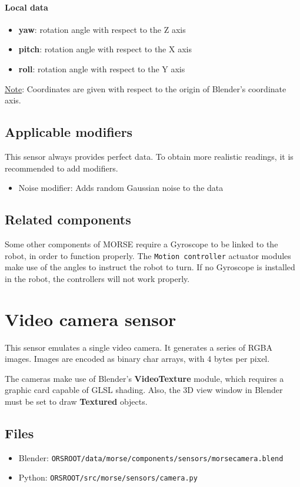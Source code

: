 \documentclass[twoside,a4paper,10pt]{report}
\newcommand{\dokutitlelevelone}[1]{\chapter{#1}}
\newcommand{\dokutitleleveltwo}[1]{\section{#1}}
\newcommand{\dokutitlelevelfour}[1]{\subsubsection{#1}}
\newcommand{\dokubold}[1]{\textbf{#1}}
\newcommand{\dokumonospace}[1]{\texttt{#1}}
\newcommand{\dokuunderline}[1]{\underline{#1}}
\newcommand{\dokuitem}{\item}
\begin{document}
\dokutitlelevelfour{Local data}

\begin{itemize}
\dokuitem  \dokubold{yaw}: rotation angle with respect to the Z axis
\dokuitem  \dokubold{pitch}: rotation angle with respect to the X axis
\dokuitem  \dokubold{roll}: rotation angle with respect to the Y axis
\end{itemize}

\dokuunderline{Note}: Coordinates are given with respect to the origin of Blender's coordinate axis.


\dokutitleleveltwo{Applicable modifiers}
\label{e70c0c8fd69fbf29dc4de09110825004}%

This sensor always provides perfect data.
To obtain more realistic readings, it is recommended to add modifiers.



\begin{itemize}
\dokuitem  Noise modifier: Adds random Gaussian noise to the data
\end{itemize}

\dokutitleleveltwo{Related components}
\label{72610f0a0494668833b2c5de69dd5e02}%

Some other components of MORSE require a Gyroscope to be linked to the robot, in order to function properly. The \dokumonospace{Motion controller} actuator modules make use of the angles to instruct the robot to turn. If no Gyroscope is installed in the robot, the controllers will not work properly.


\dokutitlelevelone{Video camera sensor}
\label{2157f6689a9fa010e655f615edf5281d}%
\label{dd6d2dcc679d12b9430a9787bab45b33}%

This sensor emulates a single video camera. It generates a series of RGBA images. Images are encoded as binary char arrays, with 4 bytes per pixel.

The cameras make use of Blender's \dokubold{VideoTexture} module, which requires a graphic card capable of GLSL shading. Also, the 3D view window in Blender must be set to draw \dokubold{Textured} objects.


\dokutitleleveltwo{Files}
\label{45b963397aa40d4a0063e0d85e4fe7a1}%

\begin{itemize}
\dokuitem  Blender: \dokumonospace{{\textdollar}ORS{\textunderscore}ROOT/data/morse/components/sensors/morse{\textunderscore}camera.blend}
\dokuitem  Python: \dokumonospace{{\textdollar}ORS{\textunderscore}ROOT/src/morse/sensors/camera.py}
\end{itemize}
\end{document}
